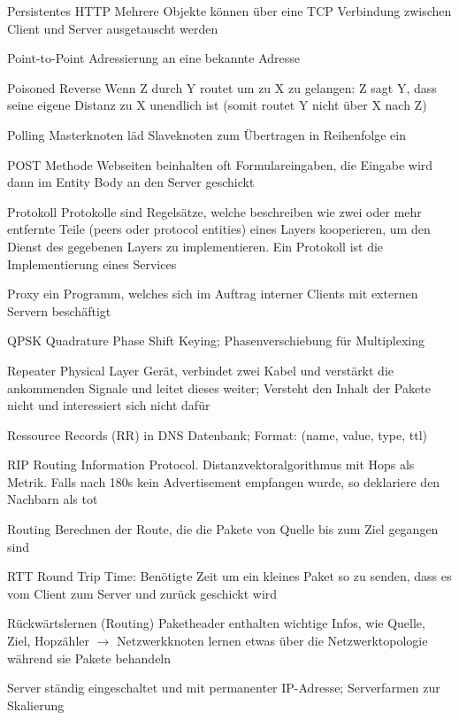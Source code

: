 \documentclass[a4paper]{article}
\begin{document}
\begin{multicols}{3}
\begin{description*}
        \item[Persistentes HTTP ] Mehrere Objekte können über eine TCP Verbindung zwischen Client und Server ausgetauscht werden
        \item[Point-to-Point] Adressierung an eine bekannte Adresse
        \item[Poisoned Reverse] Wenn Z durch Y routet um zu X zu gelangen: Z sagt Y, dass seine eigene Distanz zu X unendlich ist (somit routet Y nicht über X nach Z)
        \item[Polling] Masterknoten läd Slaveknoten zum Übertragen in Reihenfolge ein
        \item[POST Methode] Webseiten beinhalten oft Formulareingaben, die Eingabe wird dann im Entity Body an den Server geschickt
        \item[Protokoll] Protokolle sind Regelsätze, welche beschreiben wie zwei oder mehr entfernte Teile (peers oder protocol entities) eines Layers kooperieren, um den Dienst des gegebenen Layers zu implementieren. Ein Protokoll ist die Implementierung eines Services
        \item[Proxy] ein Programm, welches sich im Auftrag interner Clients mit externen Servern beschäftigt
        \item[QPSK] Quadrature Phase Shift Keying; Phasenverschiebung für Multiplexing
        \item[Repeater] Physical Layer Gerät, verbindet zwei Kabel und verstärkt die ankommenden Signale und leitet dieses weiter; Versteht den Inhalt der Pakete nicht und interessiert sich nicht dafür
        \item[Ressource Records (RR)] in DNS Datenbank; Format: (name, value, type, ttl)
        \item[RIP] Routing Information Protocol. Distanzvektoralgorithmus mit Hops als Metrik. Falls nach 180s kein Advertisement empfangen wurde, so deklariere den Nachbarn als tot
        \item[Routing] Berechnen der Route, die die Pakete von Quelle bis zum Ziel gegangen sind
        \item[RTT] Round Trip Time: Benötigte Zeit um ein kleines Paket so zu senden, dass es vom Client zum Server und zurück geschickt wird
        \item[Rückwärtslernen (Routing)] Paketheader enthalten wichtige Infos, wie Quelle, Ziel, Hopzähler $\rightarrow$ Netzwerkknoten lernen etwas über die Netzwerktopologie während sie Pakete behandeln
        \item[Server] ständig eingeschaltet und mit permanenter IP-Adresse; Serverfarmen zur Skalierung

\end{description*}
\end{multicols}
\end{document}
